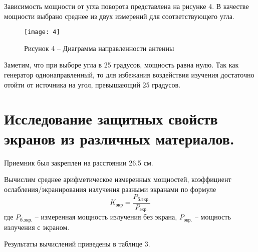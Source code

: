 Зависимость мощности от угла поворота представлена на рисунке 4.
В качестве мощности выбрано среднее из двух измерений для соответствующего угла.

\begin{figure}[H]
    \centering
    \texttt{[image: 4]}
    \caption*{Рисунок 4 -- Диаграмма направленности антенны}
    \label{fig:4}
\end{figure}

Заметим, что при выборе угла в 25 градусов, мощность равна нулю.
Так как генератор однонаправленный, то для избежания воздействия изучения
достаточно отойти от источника на угол, превышающий 25 градусов.

\section*{Исследование защитных свойств экранов из различных материалов.}
Приемник был закреплен на расстоянии 26.5 см.

Вычислим среднее арифметическое измеренных мощностей, коэффициент ослабления/экранирования
излучения разными экранами по формуле
\begin{displaymath}
    K_{\text{экр}} = \frac{P_\text{б.экр.}}{P_\text{экр.}}
\end{displaymath}
где $P_\text{б.экр.}$ -- измеренная мощность излучения без экрана, $P_\text{экр.}$ -- мощность
излучения с экраном.

Результаты вычислений приведены в таблице 3.


